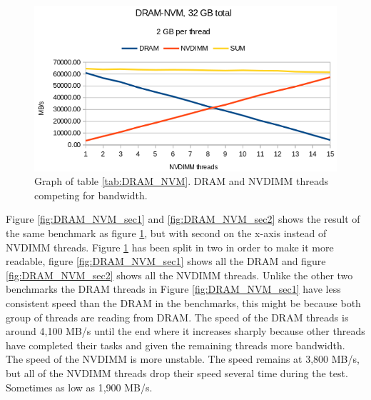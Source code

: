 \documentclass[12pt,a4paper,USenglish]{article}      %
\begin{document}
\begin{figure}[!hbtp]
\includegraphics[scale=0.7]{Benchmarks/DRAM-NVM_32GB_Figure.png}
\caption{Graph of table \ref{tab:DRAM_NVM}. DRAM and NVDIMM threads competing for bandwidth.}
\label{fig:DRAM_NVM}
\end{figure}
Figure \ref{fig:DRAM_NVM_sec1} and \ref{fig:DRAM_NVM_sec2} shows the result of the same benchmark as figure \ref{fig:DRAM_NVM}, but with second on the x-axis instead of NVDIMM threads. Figure  \ref{fig:DRAM_NVM} has been split in two in order to make it more readable, figure \ref{fig:DRAM_NVM_sec1} shows all the DRAM and figure \ref{fig:DRAM_NVM_sec2} shows all the NVDIMM threads.
Unlike the other two benchmarks the DRAM threads in Figure \ref{fig:DRAM_NVM_sec1} have less consistent speed than the DRAM in the benchmarks, this might be because both group of threads are reading from DRAM.
The speed of the DRAM threads is around 4,100 MB/s until the end where it increases sharply because other threads have completed their tasks and given the remaining threads more bandwidth. The speed of the NVDIMM is more unstable. The speed remains at 3,800 MB/s, but all of the NVDIMM threads drop their speed several time during the test. Sometimes as low as 1,900 MB/s.

\end{document}
